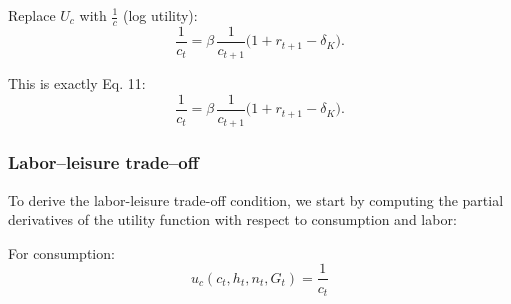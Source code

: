 Replace \(U_c\) with \(\frac{1}{c}\) (log utility):
\[
\frac{1}{c_t} = \beta\,\frac{1}{c_{t+1}}\bigl(1 + r_{t+1} - \delta_K\bigr).
\]

This is exactly Eq. 11:
\[
\boxed{\frac{1}{c_t} = \beta\,\frac{1}{c_{t+1}}\bigl(1 + r_{t+1} - \delta_K\bigr)}. \tag{11}
\]











\subsubsection{Labor--leisure trade–off }

To derive the labor-leisure trade-off condition, we start by computing the partial derivatives of the utility function with respect to consumption and labor:

For consumption:
\begin{equation*}
    u_c(c_t,h_t,n_t,G_t)=\frac{1}{c_t} \tag{B1}
\end{equation*}

